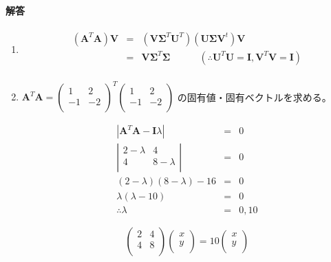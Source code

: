 \paragraph{解答}
\begin{enumerate}
\item \begin{eqnarray*}
({\mathbf A}^T{\mathbf A}) {\mathbf V} & = & ({\mathbf V}{\mathbf \Sigma^{T}}{\mathbf U}^T)({\mathbf U}{\mathbf \Sigma}{\mathbf V}^t) {\mathbf V}\\ 
 & = & {\mathbf V}{\mathbf \Sigma^{T}}{\mathbf \Sigma} \hspace{3em} (\therefore {\mathbf U^T}{\mathbf U}={\mathbf I}, {\mathbf V^T}{\mathbf V}={\mathbf I})\\ 
\end{eqnarray*}
\item \({\mathbf A}^T{\mathbf A}
=
\left(
\begin{array}{rr}
 1 &  2\\
-1 & -2\\
\end{array}
\right)^T
\left(
\begin{array}{rr}
 1 &  2\\
-1 & -2\\
\end{array}
\right)\)
の固有値・固有ベクトルを求める。

\begin{eqnarray*}
|{\mathbf A}^T{\mathbf A} - {\mathbf I}\lambda | & = & 0 \\
\left| 
\begin{array}{cc}
 2 - \lambda & 4 \\
4           & 8 - \lambda \\
\end{array}
\right| & = &  0\\
(2-\lambda)(8-\lambda) -16 & = & 0 \\
\lambda (\lambda - 10 ) & = & 0 \\
\therefore \lambda & = & 0, 10
\end{eqnarray*}

\[
\left(
\begin{array}{rr}
 2 &  4\\
 4 &  8\\
\end{array}
\right)
\left(
\begin{array}{c}
x \\
y \\
\end{array}
\right)
=
10
\left(
\begin{array}{c}
x \\
y \\
\end{array}
\right)
\]


\end{enumerate}
